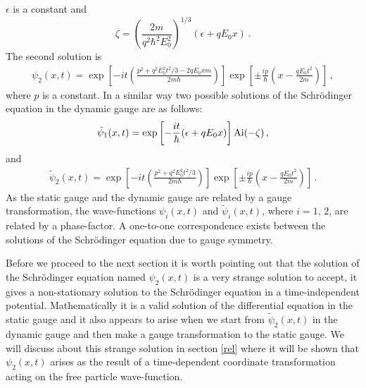 \documentclass[12pt]{article}
\begin{document}
$\epsilon$ is a constant and
$$\zeta=\left(\frac{2m}{q^2 \hbar^2 E_0^2}\right)^{1/3}(\epsilon + q E_0
x)\,. $$ The second solution is \cite{denman}
%
\begin{eqnarray}
\psi_2(x,t) = \exp\left[-it\left(\frac{p^2 + q^2E_0^2t^2/3 - 2q
E_0xm}{2m\hbar}\right)\right]\exp\left[\pm\frac{ip}{\hbar}\left(
x- \frac{qE_0t^2}{2m}\right)\right]\,,
\label{statb}
\end{eqnarray}
%
where $p$ is a constant. In a similar way two possible solutions of
the Schr\"{o}dinger equation in the dynamic gauge are as follows:
%
\begin{eqnarray}
{\tilde\psi}_1(x,t) = \exp\left[-\frac{it}{\hbar}(\epsilon + qE_0x)
\right]{\rm Ai}(-\zeta) \,,
\label{dyna}
\end{eqnarray} 
%
and
%
\begin{eqnarray} 
{\tilde\psi}_2(x,t) = \exp\left[-it\left(\frac{p^2 + q^2E_0^2t^2/3}
{2m\hbar}
\right)\right]\exp\left[\pm\frac{ip}{\hbar}\left(x-
\frac{qE_0t^2}{2m}\right)\right]\,.
\label{dynb}
\end{eqnarray}
%
As the static gauge and the dynamic gauge are related by a gauge
transformation, the wave-functions $\psi_i(x,t)$ and ${\tilde\psi}_i(x,t)$,
where $i=1,\,2$, are related by a phase-factor. A one-to-one correspondence
exists between the solutions of the Schr\"{o}dinger equation due to gauge
symmetry. 

Before we proceed to the next section it is worth pointing out that the
solution of the Schr\"{o}dinger equation named $\psi_2(x,t)$ is a very strange
solution to accept, it gives a non-stationary solution to the Schr\"{o}dinger
equation in a time-independent potential. Mathematically it is a valid
solution of the differential equation in the static gauge and it also appears
to arise when we start from ${\tilde\psi}_2(x,t)$ in the dynamic gauge and
then make a gauge transformation to the static gauge. We will discuss about
this strange solution in section \ref{rel} where it will be shown that
$\psi_2(x,t)$ arises as the result of a time-dependent coordinate
transformation acting on the free particle wave-function.
\end{document}
